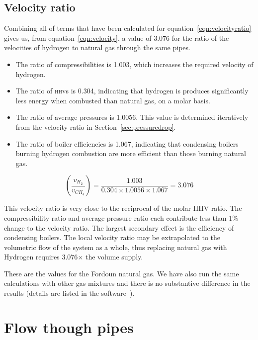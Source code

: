 \documentclass[5p]{elsarticle} %
\begin{document}
\subsection{Velocity ratio}
\label{sec:velocity}

Combining all of terms that have been calculated for equation~\eqref{eqn:velocityratio} gives us,  from equation~\eqref{eqn:velocity}, a value of 3.076 for the ratio of the velocities of hydrogen to natural gas through the same pipes.
\begin{itemize}
    \item The ratio of compressibilities is 1.003, which increases the required velocity of hydrogen.
    \item The ratio of \textsc{hhv}s is 0.304, indicating that hydrogen is produces significantly less energy when combusted than natural gas, on a molar basis.
    \item The ratio of average pressures is 1.0056. This value is determined iteratively from the velocity ratio in Section~\ref{sec:pressuredrop}.
    \item The ratio of boiler efficiencies is 1.067, indicating that condensing boilers burning hydrogen combustion are more efficient than those burning natural gas. 
\end{itemize}

\begin{equation}
\label{eqn:velocity}
    \left(\frac{v_{H_2}}{v_{CH_4}}\right) = \frac{1.003}{0.304 \times  1.0056 \times 1.067} = \mathbf{3.076}
\end{equation}

This velocity ratio is very close to the reciprocal of the molar HHV ratio.
The compressibility ratio and average pressure ratio each contribute less than 1\% change to the velocity ratio.
The largest secondary effect is the efficiency of condensing boilers. 
The local velocity ratio may be extrapolated to the volumetric flow of the system as a whole, thus replacing natural gas with Hydrogen requires 3.076$\times$ the volume supply.

These are the values for the Fordoun natural gas. 
We have also run the same calculations with other gas mixtures and there is no substantive difference in the results (details are listed in the software~\cite{Sargents_github}).

\section{Flow though pipes}
\label{sec:flow}
\end{document}
